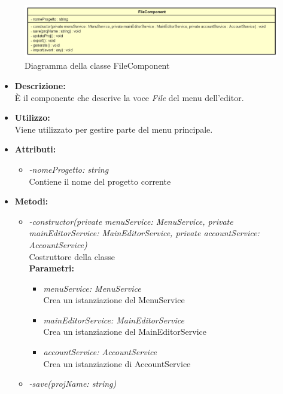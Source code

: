 \begin{figure}[h!]
	\centering
	\includegraphics[scale=0.8]{res/sections/SpecificaFrontEnd/Components/Disegnetti/file.png}
	\caption{Diagramma della classe FileComponent}
\end{figure}

\begin{itemize}
	\item \textbf{Descrizione:}\\
	È il componente che descrive la voce \textit{File} del menu dell'editor.
	\item \textbf{Utilizzo:}\\
	Viene utilizzato per gestire parte del menu principale.
	\item \textbf{Attributi:}
		\begin{itemize}
			\item \emph{-nomeProgetto: string}\\
			Contiene il nome del progetto corrente
		\end{itemize}
	\item \textbf{Metodi:}
		\begin{itemize}
			\item \emph{-constructor(private menuService: MenuService,
    private mainEditorService: MainEditorService,
    private accountService: AccountService)}\\
    		Costruttore della classe\\
    		\textbf{Parametri:}
    		\begin{itemize}
    			\item \emph{menuService: MenuService}\\
    			Crea un istanziazione del MenuService
    			\item \emph{mainEditorService: MainEditorService}\\
    			Crea un istanziazione del MainEditorService
    			\item \emph{accountService: AccountService}\\
    			Crea un istanziazione di AccountService
    		\end{itemize}
    		\item \emph{-save(projName: string)}\\

\end{itemize}
\end{itemize}
